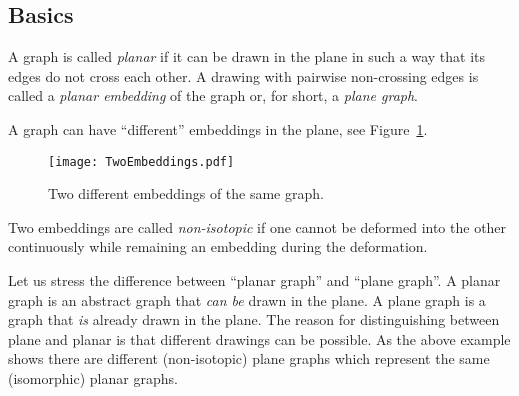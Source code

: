 \begin{page}
\setcounter{section}{3}
\setcounter{subsection}{1}
\setcounter{dfn}{0}
\label{portion:275}

\subsection{Basics}

\end{page}

\begin{page}
\setcounter{section}{3}
\setcounter{subsection}{1}
\setcounter{dfn}{1}
\label{portion:277}

\begin{dfn}
A graph is called \emph{planar} if it can be drawn in the plane in such a way that its edges do not cross each other.
A drawing with pairwise non-crossing edges is called a \emph{planar embedding} of the graph or, for short, a \emph{plane graph}.
\end{dfn}

\end{page}

\begin{page}
\setcounter{section}{3}
\setcounter{subsection}{1}
\setcounter{dfn}{1}
\label{portion:278}


A graph can have ``different'' embeddings in the plane, see Figure~\ref{fig:TwoEmbeddings}.

\begin{figure}[ht]
\begin{center}
\texttt{[image: TwoEmbeddings.pdf]}
\end{center}
\caption{Two different embeddings of the same graph.}
\label{fig:TwoEmbeddings}
\end{figure}

Two embeddings are called \emph{non-isotopic} if one cannot be deformed into the other continuously
while remaining an embedding during the deformation.


\end{page}

\begin{page}
\setcounter{section}{3}
\setcounter{subsection}{1}
\setcounter{dfn}{2}
\label{portion:280}

\begin{rem}
Let us stress the difference between ``planar graph'' and ``plane graph''.
A planar graph is an abstract graph that \emph{can be} drawn in the plane.
A plane graph is a graph that \emph{is} already drawn in the plane.
The reason for distinguishing between plane and planar is that different drawings can be possible.
As the above example shows there are different (non-isotopic) plane graphs which represent the same (isomorphic) planar graphs.
\end{rem}

\end{page}

